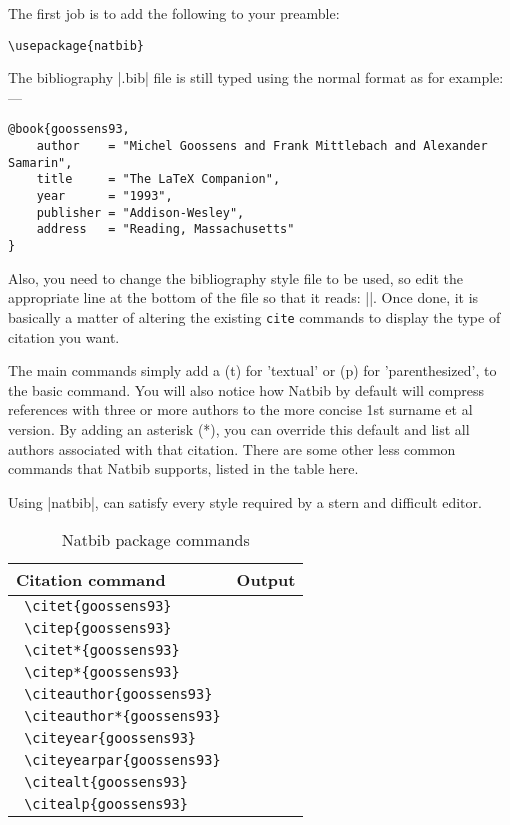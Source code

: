 The first job is to add the following to your preamble:

\begin{verbatim}
\usepackage{natbib}
\end{verbatim}


The bibliography |.bib| file is still typed using the normal format as for example:---

\begin{verbatim}
@book{goossens93,
    author    = "Michel Goossens and Frank Mittlebach and Alexander Samarin",
    title     = "The LaTeX Companion",
    year      = "1993",
    publisher = "Addison-Wesley",
    address   = "Reading, Massachusetts"
}
\end{verbatim}



Also, you need to change the bibliography style file to be used, so edit the appropriate line at the bottom of the file so that it reads: ||. Once done, it is basically a matter of altering the existing \texttt{cite} commands to display the type of citation you want.


The main commands simply add a (t)  for 'textual' or (p) for 'parenthesized', to the basic  command. You will also notice how Natbib by default will compress references with three or more authors to the more concise 1st surname et al version. By adding an asterisk (*), you can override this default and list all authors associated with that citation. There are some other less common commands that Natbib supports, listed in the table here.

Using |natbib|, can satisfy every style required by a stern and difficult editor.

\begin{table}
\begin{tabular}{ll}
\toprule
Citation command	&Output\\
\midrule
\verb+ \citet{goossens93}+	&\citep{goossens93}\\
\verb+ \citep{goossens93}+	&\citep{goossens93}\\
\verb+ \citet*{goossens93}+	&\citet*{goossens93}\\
\verb+ \citep*{goossens93}+	&\citep*{goossens93}\\
\verb+ \citeauthor{goossens93}+	&\citeauthor{goossens93} \\
\verb+ \citeauthor*{goossens93}+	&\citeauthor*{goossens93}\\
\verb+ \citeyear{goossens93}+	&\citeyear{goossens93}\\
\verb+ \citeyearpar{goossens93}+	&\citeyearpar{goossens93}\\
\verb+ \citealt{goossens93}+	&\citealt{goossens93}\\
\verb+ \citealp{goossens93}+	&\citealp{goossens93}\\
\bottomrule
\end{tabular}
\caption{Natbib package commands}
\end{table}

